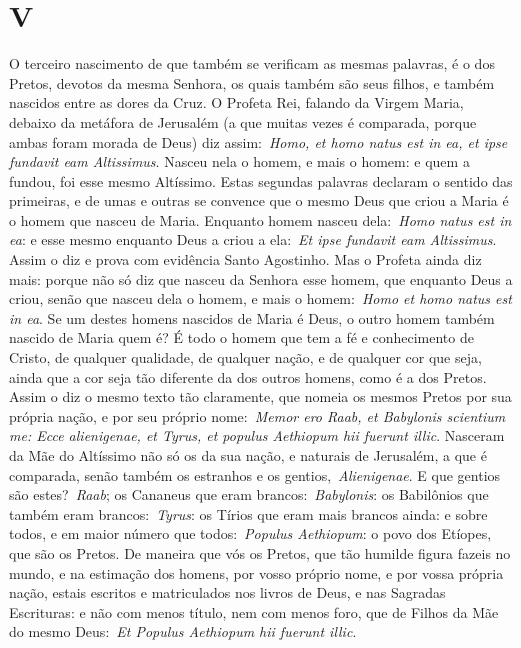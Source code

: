 \section*{V}

O terceiro nascimento de que também se verificam as mesmas
palavras, é o dos Pretos, devotos da mesma Senhora, os quais também são
seus filhos, e também nascidos entre as dores da Cruz. O Profeta Rei,
falando da Virgem Maria, debaixo da metáfora de Jerusalém (a que muitas
vezes é comparada, porque ambas foram morada de Deus) diz
assim:~\emph{Homo, et homo natus est in ea, et ipse fundavit eam
Altissimus}. Nasceu nela o homem, e mais o homem: e
quem a fundou, foi esse mesmo Altíssimo. Estas segundas palavras
declaram o sentido das primeiras, e de umas e outras se convence que o
mesmo Deus que criou a Maria é o homem que nasceu de Maria. Enquanto
homem nasceu dela:~\emph{Homo natus est in ea}: e esse mesmo enquanto
Deus a criou a ela:~\emph{Et ipse fundavit eam Altissimus}. Assim o diz
e prova com evidência Santo Agostinho. Mas o Profeta ainda diz mais:
porque não só diz que nasceu da Senhora esse homem, que enquanto Deus a
criou, senão que nasceu dela o homem, e mais o homem:~\emph{Homo et homo
natus est in ea}. Se um destes homens nascidos de Maria é Deus, o outro
homem também nascido de Maria quem é? É todo o homem que tem a fé e
conhecimento de Cristo, de qualquer qualidade, de qualquer nação, e de
qualquer cor que seja, ainda que a cor seja tão diferente da dos outros
homens, como é a dos Pretos. Assim o diz o mesmo texto tão claramente,
que nomeia os mesmos Pretos por sua própria nação, e por seu próprio
nome:~\emph{Memor ero Raab, et Babylonis scientium me: Ecce alienigenae,
et Tyrus, et populus Aethiopum hii fuerunt illic}.
Nasceram da Mãe do Altíssimo não só os da sua nação, e naturais de
Jerusalém, a que é comparada, senão também os estranhos e os
gentios,~\emph{Alienigenae}. E que gentios são estes?~\emph{Raab}; os
Cananeus que eram brancos:~\emph{Babylonis}: os Babilônios que também
eram brancos:~\emph{Tyrus}: os Tírios que eram mais brancos ainda: e
sobre todos, e em maior número que todos:~\emph{Populus Aethiopum}: o
povo dos Etíopes, que são os Pretos. De maneira que vós os Pretos, que
tão humilde figura fazeis no mundo, e na estimação dos homens, por vosso
próprio nome, e por vossa própria nação, estais escritos e matriculados
nos livros de Deus, e nas Sagradas Escrituras: e não com menos título,
nem com menos foro, que de Filhos da Mãe do mesmo Deus:~\emph{Et Populus
Aethiopum hii fuerunt illic}.


